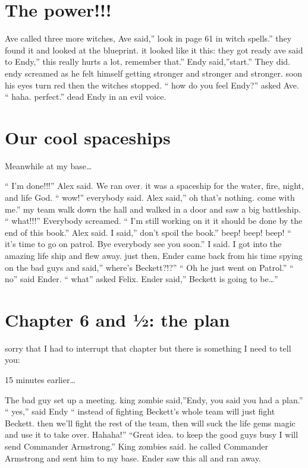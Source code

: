 \documentclass[12pt,oneside]{krantz}
\begin{document}
\hypertarget{the-power}{%
\chapter{The power!!!}\label{the-power}}

Ave called three more witches, Ave said,'' look in page 61 in witch
spells.'' they found it and looked at the blueprint. it looked like it
this: they got ready ave said to Endy,'' this really hurts a lot,
remember that.'' Endy said,''start.'' They did. endy screamed as he felt
himself getting stronger and stronger and stronger. soon his eyes turn
red then the witches stopped. `` how do you feel Endy?'' asked Ave. ``
haha. perfect.'' dead Endy in an evil voice.

\hypertarget{our-cool-spaceships}{%
\chapter{Our cool spaceships}\label{our-cool-spaceships}}

Meanwhile at my base\ldots{}

`` I'm done!!!'' Alex said. We ran over. it was a spaceship for the
water, fire, night, and life God. `` wow!'' everybody said. Alex said,''
oh that's nothing. come with me.'' my team walk down the hall and walked
in a door and saw a big battleship. `` what!!!'' Everybody screamed. ``
I'm still working on it it should be done by the end of this book.''
Alex said. I said,'' don't spoil the book.'' beep! beep! beep! `` it's
time to go on patrol. Bye everybody see you soon.'' I said. I got into
the amazing life ship and flew away. just then, Ender came back from his
time spying on the bad guys and said,'' where's Beckett?!?'' `` Oh he
just went on Patrol.'' `` no'' said Ender. `` what'' asked Felix. Ender
said,'' Beckett is going to be\ldots{}''

\hypertarget{chapter-6-and-the-plan}{%
\chapter{Chapter 6 and ½: the plan}\label{chapter-6-and-the-plan}}

sorry that I had to interrupt that chapter but there is something I need
to tell you:

15 minutes earlier\ldots{}

The bad guy set up a meeting. king zombie said,''Endy, you said you had
a plan.'' `` yes,'' said Endy `` instead of fighting Beckett's whole
team will just fight Beckett. then we'll fight the rest of the team,
then will suck the life gems magic and use it to take over. Hahaha!''
``Great idea. to keep the good guys busy I will send Commander
Armstrong.'' King zombies said. he called Commander Armstrong and sent
him to my base. Ender saw this all and ran away.
\end{document}

